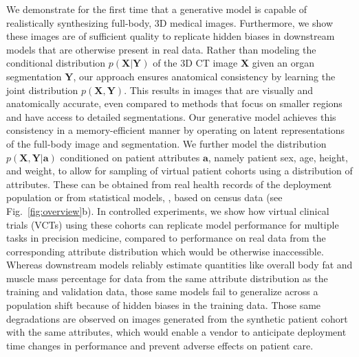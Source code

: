We demonstrate for the first time that a generative model is capable of realistically synthesizing full-body, 3D medical images. Furthermore, we show these images are of sufficient quality to replicate hidden biases in downstream models that are otherwise present in real data.
Rather than modeling the conditional distribution $p(\mathbf{X}|\mathbf{Y})$ of the 3D CT image $\mathbf{X}$ given an organ segmentation $\mathbf{Y}$,\cite{guo2024maisi} our approach ensures anatomical consistency by learning the joint distribution $p(\mathbf{X}, \mathbf{Y})$. This results in images that are visually and anatomically accurate, even compared to methods that focus on smaller regions and have access to detailed segmentations.
Our generative model achieves this consistency in a memory-efficient manner by operating on latent representations of the full-body image and segmentation.\cite{esser2020taming, rombach2022high}
We further model the distribution $p(\mathbf{X},\mathbf{Y}|\mathbf{a})$ conditioned on patient attributes $\mathbf{a}$, namely patient sex, age, height, and weight, to allow for sampling of virtual patient cohorts using a distribution of attributes.
These can be obtained from real health records of the deployment population or from statistical models, \eg, based on census data (see Fig.~\ref{fig:overview}b).
In controlled experiments, we show how virtual clinical trials (VCTs) using these cohorts can replicate model performance for multiple tasks in precision medicine, compared to performance on real data from the corresponding attribute distribution which would be otherwise inaccessible.
Whereas downstream models reliably estimate quantities like overall body fat and muscle mass percentage for data from the same attribute distribution as the training and validation data, those same models fail to generalize across a population shift because of hidden biases in the training data.
Those same degradations are observed on images generated from the synthetic patient cohort with the same attributes, which would enable a vendor to anticipate deployment time changes in performance and prevent adverse effects on patient care.




